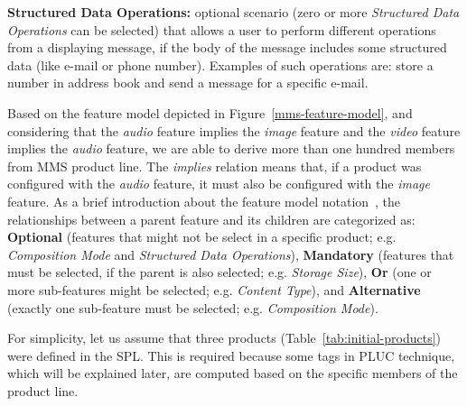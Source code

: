\documentclass{acm_proc_article-sp}
\begin{document}
{\bf Structured Data Operations:} optional scenario (zero or more \emph{Structured Data Operations} can be selected) that allows a user to perform different operations from a displaying message, if the body of the message includes some structured data (like e-mail or phone number). Examples of such operations are: store a number in address book and send a message for a specific e-mail.

Based on the feature model depicted in Figure~\ref{mms-feature-model}, and considering that the \emph{audio} feature implies the \emph{image} feature and the \emph{video} feature implies the \emph{audio} feature, we are able to derive more than one hundred members from MMS product line. The \emph{implies} relation means that, if a product was configured with the \emph{audio} feature, it must also be configured with the \emph{image} feature. As a brief introduction about the feature model notation~\cite{czarnecki-book,gheyi-alloy-06}, the relationships between a parent feature and its children are categorized as: {\bf Optional} (features that might not be select in a specific product; e.g. \emph{Composition Mode} and \emph{Structured Data Operations}), {\bf Mandatory} (features that must be selected, if the parent is also selected; e.g. \emph{Storage Size}), {\bf Or} (one or more sub-features might be selected; e.g. \emph{Content Type}), and {\bf Alternative} (exactly one sub-feature must be selected; e.g. \emph{Composition Mode}).

\begin{figure*}
\centering
{}
\caption{MMS feature model}
\label{mms-feature-model}
\end{figure*}

For simplicity, let us assume that three products (Table~\ref{tab:initial-products}) were defined in the SPL. 
This is required because some tags in PLUC technique, which will be explained later, are computed based on the specific members 
of the product line. 
\end{document}
